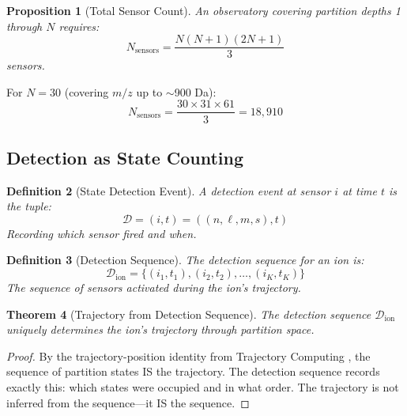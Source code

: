 \documentclass[twocolumn,10pt]{article}
\newtheorem{theorem}{Theorem}[section]
\newtheorem{proposition}[theorem]{Proposition}
\newtheorem{definition}[theorem]{Definition}
\begin{document}
\begin{proposition}[Total Sensor Count]
An observatory covering partition depths 1 through $N$ requires:
\begin{equation}
    N_{\text{sensors}} = \frac{N(N+1)(2N+1)}{3}
\end{equation}
sensors.
\end{proposition}

For $N = 30$ (covering $m/z$ up to $\sim$900 Da):
\begin{equation}
    N_{\text{sensors}} = \frac{30 \times 31 \times 61}{3} = 18,910
\end{equation}

\subsection{Detection as State Counting}

\begin{definition}[State Detection Event]
A detection event at sensor $i$ at time $t$ is the tuple:
\begin{equation}
    \mathcal{D} = (i, t) = ((n, \ell, m, s), t)
\end{equation}
Recording which sensor fired and when.
\end{definition}

\begin{definition}[Detection Sequence]
The detection sequence for an ion is:
\begin{equation}
    \mathcal{D}_{\text{ion}} = \{(i_1, t_1), (i_2, t_2), \ldots, (i_K, t_K)\}
\end{equation}
The sequence of sensors activated during the ion's trajectory.
\end{definition}

\begin{theorem}[Trajectory from Detection Sequence]
\label{thm:trajectory_detection}
The detection sequence $\mathcal{D}_{\text{ion}}$ uniquely determines the ion's trajectory through partition space.
\end{theorem}

\begin{proof}
By the trajectory-position identity from Trajectory Computing \cite{trajectorycomputing2026}, the sequence of partition states IS the trajectory. The detection sequence records exactly this: which states were occupied and in what order. The trajectory is not inferred from the sequence---it IS the sequence.
\end{proof}
\end{document}
